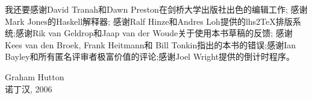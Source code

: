 我还要感谢David Tranah和Dawn Preston在剑桥大学出版社出色的编辑工作; 感谢Mark
Jones的Haskell解释器; 感谢Ralf Hinze和Andres Loh提供的lhs2TeX排版系统;感谢Rik
van Geldrop和Jaap van der Woude关于使用本书草稿的反馈; 感谢Kees van den Broek,
Frank Heitmann和 Bill Tonkin指出的本书的错误;感谢Ian
Bayley和所有匿名评审者极富价值的评论;感谢Joel Wright提供的倒计时程序。

\begin{flushright}
Graham Hutton\\
诺丁汉, 2006
\end{flushright}
